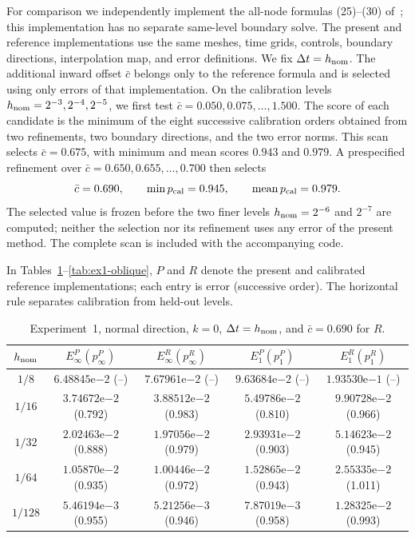 \documentclass[11pt]{article}
\theoremstyle{definition}
\theoremstyle{remark}
\begin{document}
For comparison we independently implement the all-node formulas
(25)--(30) of~\cite{CalzolaEtAl2023}; this implementation has no separate
same-level boundary solve.  The present and reference implementations use the
same meshes, time grids, controls, boundary directions, interpolation map, and
error definitions.  We fix $\Delta t=h_{\rm nom}$.  The additional inward
offset $\bar c$ belongs only to the reference formula and is selected using
only errors of that implementation.  On the calibration levels
$h_{\rm nom}=2^{-3},2^{-4},2^{-5}$, we first test
$\bar c=0.050,0.075,\ldots,1.500$.  The score of each candidate is the minimum
of the eight successive calibration orders obtained from two refinements, two
boundary directions, and the two error norms.  This scan selects
$\bar c=0.675$, with minimum and mean scores $0.943$ and $0.979$.
A prespecified refinement over $\bar c=0.650,0.655,\ldots,0.700$ then selects
\begin{equation}
 \bar c=0.690,
 \qquad \min p_{\rm cal}=0.945,
 \qquad \operatorname{mean}p_{\rm cal}=0.979.
 \label{eq:selected-cbar}
\end{equation}
The selected value is frozen before the two finer levels
$h_{\rm nom}=2^{-6}$ and $2^{-7}$ are computed; neither the selection nor its
refinement uses any error of the present method.  The complete scan is included
with the accompanying code.

In Tables~\ref{tab:ex1-normal}--\ref{tab:ex1-oblique}, $P$ and $R$ denote the
present and calibrated reference implementations; each entry is error
(successive order).  The horizontal rule separates calibration from held-out
levels.

\begin{table}[htbp]
 \centering
 \footnotesize
 \setlength{\tabcolsep}{3.1pt}
 \renewcommand{\arraystretch}{0.94}
 \caption{Experiment~1, normal direction, $k=0$, $\Delta t=h_{\rm nom}$,
 and $\bar c=0.690$ for $R$.}
 \label{tab:ex1-normal}
 \begin{tabular}{ccccc}
  \toprule
  $h_{\rm nom}$ & $E_\infty^P(p_\infty^P)$ & $E_\infty^R(p_\infty^R)$
  & $E_1^P(p_1^P)$ & $E_1^R(p_1^R)$\\
  \midrule
  $1/8$   & $6.48845\mathrm e{-2}$ (--)    & $7.67961\mathrm e{-2}$ (--)    & $9.63684\mathrm e{-2}$ (--)    & $1.93530\mathrm e{-1}$ (--)\\
  $1/16$  & $3.74672\mathrm e{-2}$ (0.792) & $3.88512\mathrm e{-2}$ (0.983) & $5.49786\mathrm e{-2}$ (0.810) & $9.90728\mathrm e{-2}$ (0.966)\\
  $1/32$  & $2.02463\mathrm e{-2}$ (0.888) & $1.97056\mathrm e{-2}$ (0.979) & $2.93931\mathrm e{-2}$ (0.903) & $5.14623\mathrm e{-2}$ (0.945)\\
  \midrule
  $1/64$  & $1.05870\mathrm e{-2}$ (0.935) & $1.00446\mathrm e{-2}$ (0.972) & $1.52865\mathrm e{-2}$ (0.943) & $2.55335\mathrm e{-2}$ (1.011)\\
  $1/128$ & $5.46194\mathrm e{-3}$ (0.955) & $5.21256\mathrm e{-3}$ (0.946) & $7.87019\mathrm e{-3}$ (0.958) & $1.28325\mathrm e{-2}$ (0.993)\\
  \bottomrule
 \end{tabular}
\end{table}
\end{document}
